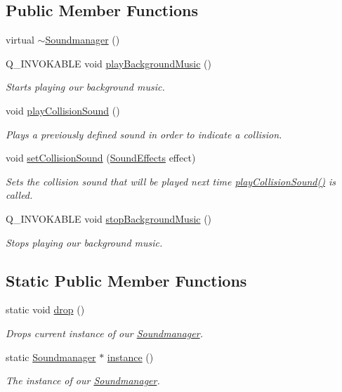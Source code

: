 \subsection*{Public Member Functions}
\begin{DoxyCompactItemize}
\item 
virtual \hyperlink{class_soundmanager_a098a604a4cb0a238863ddb0065f11885}{$\sim$\+Soundmanager} ()
\item 
Q\+\_\+\+I\+N\+V\+O\+K\+A\+B\+L\+E void \hyperlink{class_soundmanager_adc77c21e0705c9220b6bfff6d8957d7c}{play\+Background\+Music} ()
\begin{DoxyCompactList}\small\item\em Starts playing our background music. \end{DoxyCompactList}\item 
void \hyperlink{class_soundmanager_a6116af7088ee72cafda5d3e1c6b6600b}{play\+Collision\+Sound} ()
\begin{DoxyCompactList}\small\item\em Plays a previously defined sound in order to indicate a collision. \end{DoxyCompactList}\item 
void \hyperlink{class_soundmanager_a490ddb5b63b94701ad5d246d27759b14}{set\+Collision\+Sound} (\hyperlink{soundmanager_8h_a7fbdfef23a43c911ebc18ef1b9d9808d}{Sound\+Effects} effect)
\begin{DoxyCompactList}\small\item\em Sets the collision sound that will be played next time \hyperlink{class_soundmanager_a6116af7088ee72cafda5d3e1c6b6600b}{play\+Collision\+Sound()} is called. \end{DoxyCompactList}\item 
Q\+\_\+\+I\+N\+V\+O\+K\+A\+B\+L\+E void \hyperlink{class_soundmanager_a36411846ae8c5cd18239cfb913f3dc83}{stop\+Background\+Music} ()
\begin{DoxyCompactList}\small\item\em Stops playing our background music. \end{DoxyCompactList}\end{DoxyCompactItemize}
\subsection*{Static Public Member Functions}
\begin{DoxyCompactItemize}
\item 
static void \hyperlink{class_soundmanager_aa4a2f89d1c517bff42654038da492d65}{drop} ()
\begin{DoxyCompactList}\small\item\em Drops current instance of our \hyperlink{class_soundmanager}{Soundmanager}. \end{DoxyCompactList}\item 
static \hyperlink{class_soundmanager}{Soundmanager} $\ast$ \hyperlink{class_soundmanager_aa1fa87053cd1cd240447a54327962b23}{instance} ()
\begin{DoxyCompactList}\small\item\em The instance of our \hyperlink{class_soundmanager}{Soundmanager}. \end{DoxyCompactList}\end{DoxyCompactItemize}
